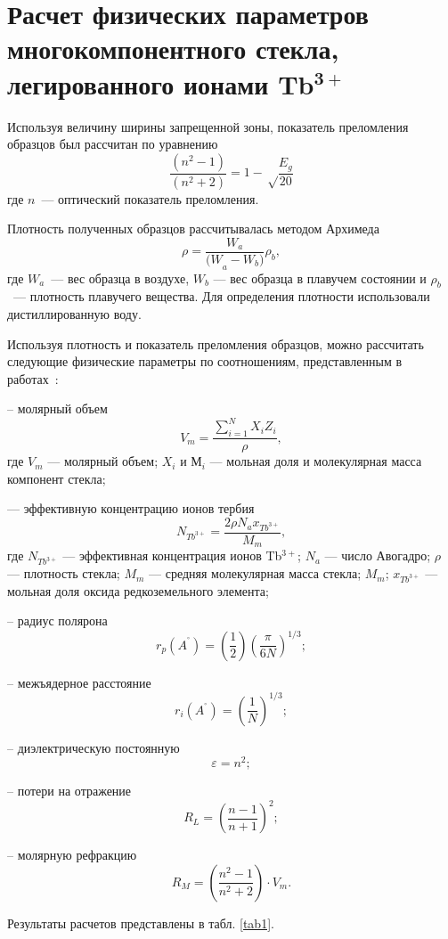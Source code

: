 \documentclass[press]{vestnik}
\begin{document}
\section{Расчет физических параметров многокомпонентного стекла, легированного ионами Tb$^\mathbf{3+}$}

Используя величину ширины запрещенной зоны, показатель преломления образцов 
был рассчитан по уравнению~\cite{B17}
\[
\frac{\left( n^{2}-1 \right)}{\left( n^{2}+2 \right)}=1-\sqrt 
\frac{E_{g}}{20} 
\]
где $n$~--- оптический показатель преломления.

Плотность полученных образцов рассчитывалась методом Архимеда
\[
\rho =\frac{W_{a}}{{(W}_{a}-W_{b})} \rho_{b},
\]
где $W_{a}$~--- вес образца в воздухе, $W_{b}$ --- вес образца в плавучем 
состоянии и $\rho_{b}$~--- плотность плавучего вещества. Для определения 
плотности использовали дистиллированную воду.

Используя плотность и показатель преломления образцов, можно рассчитать 
следующие физические параметры по соотношениям, представленным в работах~\cite{B18,B19}:


-- молярный объем
\[
V_{m} =\frac{\sum\limits_{i=1}^N {X_{i}Z_{i}} }{\rho },
\]
где $V_{m}$ --- молярный объем; $X_{i}$ и $М_{i}$ --- мольная доля и 
молекулярная масса компонент стекла;


--- эффективную концентрацию ионов тербия
\[
N_{{Tb}^{3+}}=\frac{2\rho  N_{a} x_{{Tb}^{3+}}}{M_{m}},
\]
где $N_{{Tb}^{3+}}$ --- эффективная концентрация ионов Tb$^{3+}$; $N_{a}$ 
--- число Авогадро; $\rho $ --- плотность стекла; $M_{m}$ --- средняя 
молекулярная масса стекла; $M_{m}$; $x_{{Tb}^{3+}}$ --- мольная доля оксида 
редкоземельного элемента;

-- радиус полярона
\[
r_{p}(A^{^{\circ}})=\left(\frac{1}{2}\right)\left(\frac{\pi }{6N}\right)^{1/3};
\]


-- межъядерное расстояние
\[
r_{i}\left( A^{^{\circ}} \right)=\left(\frac{1}{N}\right)^{1/3};
\]


-- диэлектрическую постоянную
\[
\varepsilon =n^{2};
\]


-- потери на отражение
\[
R_{L}={\left(\frac{n-1}{n+1}\right)}^{2};
\]


-- молярную рефракцию
\[
R_{M}=\left( \frac{n^{2}-1}{n^{2}+2} \right)\cdot V_{m}.
\]

Результаты расчетов представлены в табл. \ref{tab1}.
\end{document}
